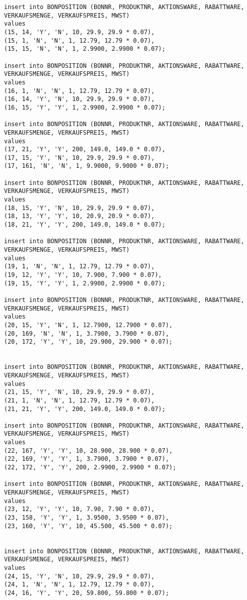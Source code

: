 \begin{lstlisting}
insert into BONPOSITION (BONNR, PRODUKTNR, AKTIONSWARE, RABATTWARE, VERKAUFSMENGE, VERKAUFSPREIS, MWST)
values
(15, 14, 'Y', 'N', 10, 29.9, 29.9 * 0.07),
(15, 1, 'N', 'N', 1, 12.79, 12.79 * 0.07),
(15, 15, 'N', 'N', 1, 2.9900, 2.9900 * 0.07);

insert into BONPOSITION (BONNR, PRODUKTNR, AKTIONSWARE, RABATTWARE, VERKAUFSMENGE, VERKAUFSPREIS, MWST)
values
(16, 1, 'N', 'N', 1, 12.79, 12.79 * 0.07),
(16, 14, 'Y', 'N', 10, 29.9, 29.9 * 0.07),
(16, 15, 'Y', 'Y', 1, 2.9900, 2.9900 * 0.07);

insert into BONPOSITION (BONNR, PRODUKTNR, AKTIONSWARE, RABATTWARE, VERKAUFSMENGE, VERKAUFSPREIS, MWST)
values
(17, 21, 'Y', 'Y', 200, 149.0, 149.0 * 0.07),
(17, 15, 'Y', 'N', 10, 29.9, 29.9 * 0.07),
(17, 161, 'N', 'N', 1, 9.9000, 9.9000 * 0.07);

insert into BONPOSITION (BONNR, PRODUKTNR, AKTIONSWARE, RABATTWARE, VERKAUFSMENGE, VERKAUFSPREIS, MWST)
values
(18, 15, 'Y', 'N', 10, 29.9, 29.9 * 0.07),
(18, 13, 'Y', 'Y', 10, 20.9, 20.9 * 0.07),
(18, 21, 'Y', 'Y', 200, 149.0, 149.0 * 0.07);

insert into BONPOSITION (BONNR, PRODUKTNR, AKTIONSWARE, RABATTWARE, VERKAUFSMENGE, VERKAUFSPREIS, MWST)
values
(19, 1, 'N', 'N', 1, 12.79, 12.79 * 0.07),
(19, 12, 'Y', 'Y', 10, 7.900, 7.900 * 0.07),
(19, 15, 'Y', 'Y', 1, 2.9900, 2.9900 * 0.07);

insert into BONPOSITION (BONNR, PRODUKTNR, AKTIONSWARE, RABATTWARE, VERKAUFSMENGE, VERKAUFSPREIS, MWST)
values
(20, 15, 'Y', 'N', 1, 12.7900, 12.7900 * 0.07),
(20, 169, 'N', 'N', 1, 3.7900, 3.7900 * 0.07),
(20, 172, 'Y', 'Y', 10, 29.900, 29.900 * 0.07);


insert into BONPOSITION (BONNR, PRODUKTNR, AKTIONSWARE, RABATTWARE, VERKAUFSMENGE, VERKAUFSPREIS, MWST)
values
(21, 15, 'Y', 'N', 10, 29.9, 29.9 * 0.07),
(21, 1, 'N', 'N', 1, 12.79, 12.79 * 0.07),
(21, 21, 'Y', 'Y', 200, 149.0, 149.0 * 0.07);

insert into BONPOSITION (BONNR, PRODUKTNR, AKTIONSWARE, RABATTWARE, VERKAUFSMENGE, VERKAUFSPREIS, MWST)
values
(22, 167, 'Y', 'Y', 10, 28.900, 28.900 * 0.07),
(22, 169, 'Y', 'Y', 1, 3.7900, 3.7900 * 0.07),
(22, 172, 'Y', 'Y', 200, 2.9900, 2.9900 * 0.07);

insert into BONPOSITION (BONNR, PRODUKTNR, AKTIONSWARE, RABATTWARE, VERKAUFSMENGE, VERKAUFSPREIS, MWST)
values
(23, 12, 'Y', 'Y', 10, 7.90, 7.90 * 0.07),
(23, 158, 'Y', 'Y', 1, 3.9500, 3.9500 * 0.07),
(23, 160, 'Y', 'Y', 10, 45.500, 45.500 * 0.07);


insert into BONPOSITION (BONNR, PRODUKTNR, AKTIONSWARE, RABATTWARE, VERKAUFSMENGE, VERKAUFSPREIS, MWST)
values
(24, 15, 'Y', 'N', 10, 29.9, 29.9 * 0.07),
(24, 1, 'N', 'N', 1, 12.79, 12.79 * 0.07),
(24, 16, 'Y', 'Y', 20, 59.800, 59.800 * 0.07);



\end{lstlisting}
